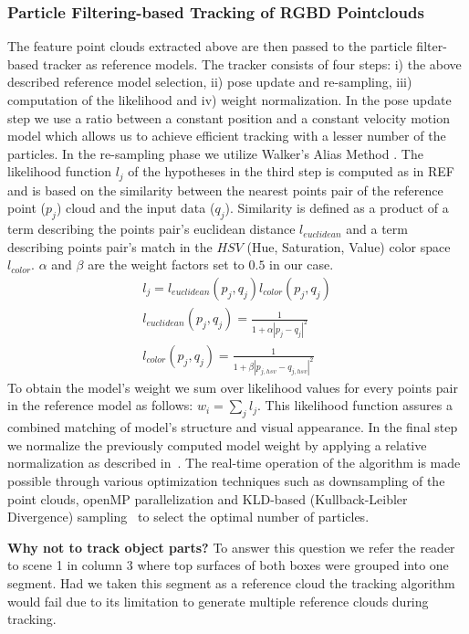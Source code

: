 \subsubsection{Particle Filtering-based Tracking of RGBD Pointclouds}
\label{sec:tracking}
The feature point clouds extracted above are then passed to the
particle filter-based tracker as reference models. The tracker 
consists of four steps: i) the above described reference model
selection, ii) pose update and re-sampling, iii) computation of the
likelihood and iv)
weight normalization. In the pose update step we use a ratio between
a constant position and a constant velocity motion model which allows
us to achieve efficient tracking with a lesser number of the
particles. In the re-sampling phase we utilize Walker’s Alias Method
\cite{Walker}. The likelihood function $l_{j}$ of the hypotheses in the third
step is computed as in REF%
 and is based on the similarity  between the nearest points
pair of the reference point ($p_{j}$) cloud and the input data ($q_{j}$). Similarity is
defined as a product of a term describing the points pair's euclidean distance $l_{euclidean}$ 
and a term describing points pair's match in the $HSV$ (Hue, Saturation, Value) color
space $l_{color}$. $\alpha$ and $\beta$ are the weight factors set to $0.5$ in our case.
\begin{eqnarray}
  l_{j} = l_{euclidean}(p_{j},q_{j})l_{color}(p_{j},q_{j}) \nonumber \\
  l_{euclidean}(p_{j},q_{j}) = \frac{1}{1+\alpha|p_{j}-q_{j}|^2} \nonumber \\
  l_{color}(p_{j},q_{j}) = \frac{1}{1+\beta|p_{j,hsv}-q_{j,hsv}|^2} 
  \label{eq:likelihood}
\end{eqnarray}
To obtain the model's weight we sum over likelihood values for
every points pair in the reference model as follows: $w_{i} = \sum\limits_{j}l_{j}$. This likelihood function assures a combined
matching of model's structure and visual appearance. In the final step we normalize the 
previously computed model weight by applying a relative normalization as
described in~\cite{AzadMAD11}. The real-time operation of the algorithm
is made possible through various optimization techniques such as
downsampling of the point clouds, openMP parallelization and KLD-based 
(Kullback-Leibler Divergence) 
sampling~\cite{Fox01KLD} to select the optimal number of particles.


\textbf{Why not to track object parts?} To answer this question we refer the reader 
to scene 1 in %
 column 3 where top surfaces of both boxes were grouped into one segment.
Had we taken this segment as a reference cloud the tracking algorithm would fail due
to its limitation to generate multiple reference clouds during tracking.


